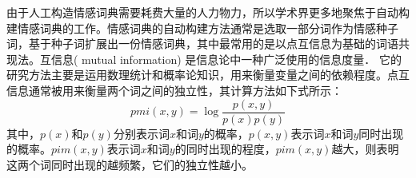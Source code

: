 \documentclass[cs4size,a4paper]{ctexart}
\numberwithin{equation}{section}
\numberwithin{table}{section}
\numberwithin{figure}{section}
\begin{document}
 \begin{table}
  \centering
  \caption{股票情感词}\label{tb:sentiment}

\end{table}

由于人工构造情感词典需要耗费大量的人力物力，所以学术界更多地聚焦于自动构建情感词典的工作。情感词典的自动构建方法通常是选取一部分词作为情感种子词，基于种子词扩展出一份情感词典，其中最常用的是以点互信息为基础的词语共现法。互信息( mutual information) 是信息论中一种广泛使用的信息度量． 它的研究方法主要是运用数理统计和概率论知识，用来衡量变量之间的依赖程度。点互信息通常被用来衡量两个词之间的独立性，其计算方法如下式所示：
\begin{equation}\label{pmi}
  pmi(x,y) = \log \frac{p(x,y)}{p(x)p(y)}
\end{equation}
其中，$p(x)$和$p(y)$分别表示词$x$和词$y$的概率，$p(x,y)$表示词$x$和词$y$同时出现的概率。$pim(x,y)$表示词$x$和词$y$的同时出现的程度，$pim(x,y)$越大，则表明这两个词同时出现的越频繁，它们的独立性越小。
\end{document}

